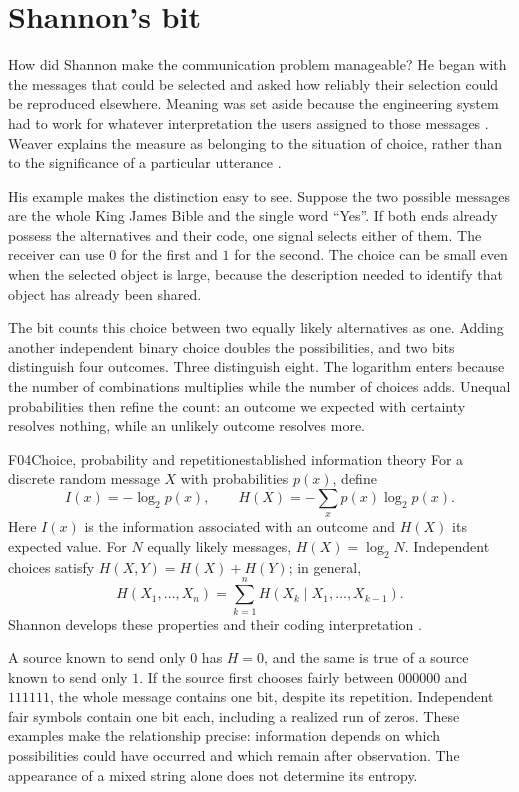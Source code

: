 \documentclass[11pt,a4paper]{article}
\begin{document}
\section{Shannon's bit}
\label{sec:shannon}

How did Shannon make the communication problem manageable? He began with the
messages that could be selected and asked how reliably their selection could
be reproduced elsewhere. Meaning was set aside because the engineering system
had to work for whatever interpretation the users assigned to those messages
\citep{Shannon1948}. Weaver explains the measure as belonging to the situation
of choice, rather than to the significance of a particular utterance
\citep{Weaver1949}.

His example makes the distinction easy to see. Suppose the two possible
messages are the whole King James Bible and the single word ``Yes''. If both
ends already possess the alternatives and their code, one signal selects either
of them. The receiver can use $0$ for the first and $1$ for the second. The
choice can be small even when the selected object is large, because the
description needed to identify that object has already been shared.

The bit counts this choice between two equally likely alternatives as one.
Adding another independent binary choice doubles the possibilities, and two
bits distinguish four outcomes. Three distinguish eight. The logarithm enters
because the number of combinations multiplies while the number of choices
adds. Unequal probabilities then refine the count: an outcome we expected
with certainty resolves nothing, while an unlikely outcome resolves more.

\begin{formal}{F04}{Choice, probability and repetition}{established information theory}
For a discrete random message $X$ with probabilities $p(x)$, define
\begin{equation}\label{eq:entropy}
 I(x)=-\log_2p(x),\qquad H(X)=-\sum_xp(x)\log_2p(x).
\end{equation}
Here $I(x)$ is the information associated with an outcome and $H(X)$ its
expected value. For $N$ equally likely messages, $H(X)=\log_2N$.
Independent choices satisfy $H(X,Y)=H(X)+H(Y)$; in general,
\begin{equation}\label{eq:chain-entropy}
 H(X_1,\ldots,X_n)=\sum_{k=1}^n H(X_k\mid X_1,\ldots,X_{k-1}).
\end{equation}
Shannon develops these properties and their coding interpretation
\citep{Shannon1948}.

A source known to send only $0$ has $H=0$, and the same is true of a source
known to send only $1$. If the source first chooses fairly between $000000$
and $111111$, the whole message contains one bit, despite its repetition.
Independent fair symbols contain one bit each, including a realized run of
zeros. These examples make the relationship precise: information depends on
which possibilities could have occurred and which remain after observation.
The appearance of a mixed string alone does not determine its entropy.
\end{formal}
\end{document}
